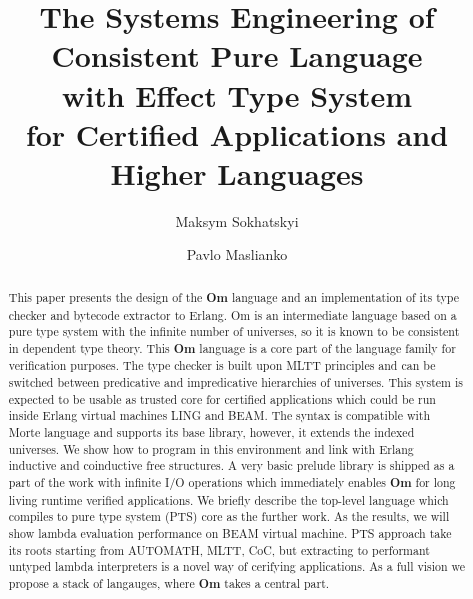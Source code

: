 \documentclass{aip-cp}
\begin{document}
\title{The Systems Engineering of Consistent Pure Language \\
       with Effect Type System \\
       for Certified Applications and Higher Languages}

\author[aff1]{Maksym Sokhatskyi}
\author[aff1]{Pavlo Maslianko}


\maketitle
\vspace{1cm}
\begin{abstract}
This paper presents the design of the {\bf Om} language and an implementation of its type checker and bytecode extractor to Erlang.
Om is an intermediate language based on a pure type system with the infinite number of universes, so it is known to be consistent in dependent type theory.
This {\bf Om} language is a core part of the language family for verification purposes.
The type checker is built upon MLTT principles and can be switched between predicative and impredicative hierarchies of universes.
This system is expected to be usable as trusted core for certified applications which could be run inside Erlang virtual machines LING and BEAM.
The syntax is compatible with Morte language and supports its base library, however, it extends the indexed universes.
We show how to program in this environment and link with Erlang inductive and coinductive free structures.
A very basic prelude library is shipped as a part of the work with infinite I/O operations which
immediately enables {\bf Om} for long living runtime verified applications.
We briefly describe the top-level language which compiles to pure type system (PTS) core as the further work.
As the results, we will show lambda evaluation performance on BEAM virtual machine.
PTS approach take its roots starting from AUTOMATH, MLTT, CoC,
but extracting to performant untyped lambda interpreters is a novel way of cerifying applications.
As a full vision we propose a stack of langauges, where {\bf Om} takes a central part.
\end{abstract}
\end{document}
